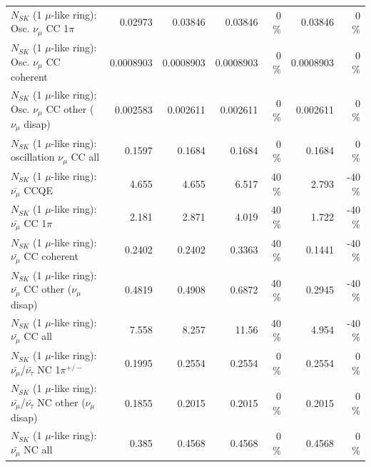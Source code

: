 \begin{table}
\begin{tabular}{| l | r | r | r  r | r  r |}
                          $N_{SK}$ (1 $\mu$-like ring): Osc. $\nu_\mu$ CC 1$\pi$ &         0.02973 &         0.03846 &         0.03846 &        0 \%  &         0.03846 &        0 \%  \\ 
                        $N_{SK}$ (1 $\mu$-like ring): Osc. $\nu_\mu$ CC coherent &       0.0008903 &       0.0008903 &       0.0008903 &        0 \%  &       0.0008903 &        0 \%  \\ 
         $N_{SK}$ (1 $\mu$-like ring): Osc. $\nu_\mu$ CC other ($\nu_\mu$ disap) &        0.002583 &        0.002611 &        0.002611 &        0 \%  &        0.002611 &        0 \%  \\ 
                      $N_{SK}$ (1 $\mu$-like ring): oscillation $\nu_\mu$ CC all &          0.1597 &          0.1684 &          0.1684 &        0 \%  &          0.1684 &        0 \%  \\ 
\hline
\hline
                              $N_{SK}$ (1 $\mu$-like ring): $\bar{\nu_\mu}$ CCQE &           4.655 &           4.655 &           6.517 &       40 \%  &           2.793 &      -40 \%  \\ 
                         $N_{SK}$ (1 $\mu$-like ring): $\bar{\nu_\mu}$ CC 1$\pi$ &           2.181 &           2.871 &           4.019 &       40 \%  &           1.722 &      -40 \%  \\ 
                       $N_{SK}$ (1 $\mu$-like ring): $\bar{\nu_\mu}$ CC coherent &          0.2402 &          0.2402 &          0.3363 &       40 \%  &          0.1441 &      -40 \%  \\ 
        $N_{SK}$ (1 $\mu$-like ring): $\bar{\nu_\mu}$ CC other ($\nu_\mu$ disap) &          0.4819 &          0.4908 &          0.6872 &       40 \%  &          0.2945 &      -40 \%  \\ 
                          $N_{SK}$ (1 $\mu$-like ring): $\bar{\nu_{\mu}}$ CC all &           7.558 &           8.257 &           11.56 &       40 \%  &           4.954 &      -40 \%  \\ 
\hline
  $N_{SK}$ (1 $\mu$-like ring): $\bar{\nu_\mu}$/$\bar{\nu_\tau}$ NC 1$\pi^{+/-}$ &          0.1995 &          0.2554 &          0.2554 &        0 \%  &          0.2554 &        0 \%  \\ 
$N_{SK}$ (1 $\mu$-like ring): $\bar{\nu_\mu}$/$\bar{\nu_\tau}$ NC other ($\nu_\mu$ disap) &          0.1855 &          0.2015 &          0.2015 &        0 \%  &          0.2015 &        0 \%  \\ 
                          $N_{SK}$ (1 $\mu$-like ring): $\bar{\nu_{\mu}}$ NC all &           0.385 &          0.4568 &          0.4568 &        0 \%  &          0.4568 &        0 \%  \\ 

\end{tabular}
\end{table}
